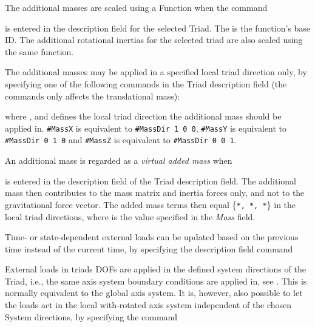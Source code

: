 The additional masses are scaled using a Function when the command


\noindent
is entered in the description field for the selected Triad.
The {\tt{}} is the function's base ID.
The additional rotational inertias for the selected triad are also scaled using
the same function.

The additional masses may be applied in a specified local triad direction only,
by specifying one of the following commands in the Triad description field
(the commands only affects the translational mass):



\noindent
where {\tt{}}, {\tt{}} and {\tt{}} defines the
local triad direction the additional mass should be applied in.
{\tt\#MassX} is equivalent to {\tt\#MassDir 1 0 0}, {\tt\#MassY} is equivalent
to {\tt\#MassDir 0 1 0} and {\tt\#MassZ} is equivalent to {\tt\#MassDir 0 0 1}.

\clearpage
An additional mass is regarded as a {\sl virtual added mass} when


\noindent
is entered in the description field of the Triad description field.
The additional mass then contributes to the mass matrix and inertia forces only,
and not to the gravitational force vector. The added mass terms then equal
\{{\tt{}*, *,
*}\} in the local triad directions,
where {\tt{}} is the value specified in the {\sl Mass} field.



Time- or state-dependent external loads can be updated based on the previous
time instead of the current time, by specifying the description field command


External loads in triads DOFs are applied in the defined system directions
of the Triad, i.e., the same axis system boundary conditions are applied in,
see .
This is normally equivalent to the global axis system. It is, however,
also possible to let the loads act in the local with-rotated axis system
independent of the chosen System directions, by specifying the command


